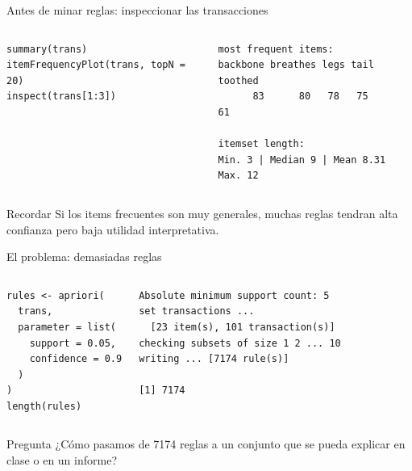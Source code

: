 \documentclass[10pt,aspectratio=169]{beamer}
\begin{document}
\begin{frame}[fragile]{Antes de minar reglas: inspeccionar las transacciones}
\begin{columns}[T]
\begin{lstlisting}[style=rcode]
summary(trans)
itemFrequencyPlot(trans, topN = 20)
inspect(trans[1:3])
\end{lstlisting}

\begin{lstlisting}[style=out]
most frequent items:
backbone breathes legs tail toothed
      83      80   78   75      61

itemset length:
Min. 3 | Median 9 | Mean 8.31
Max. 12
\end{lstlisting}
\end{columns}

\begin{alertblock}{Recordar}
Si los items frecuentes son muy generales, muchas reglas tendran alta confianza pero baja utilidad interpretativa.
\end{alertblock}
\end{frame}

\begin{frame}[fragile]{El problema: demasiadas reglas}
\begin{columns}[T]
\begin{lstlisting}[style=rcode]
rules <- apriori(
  trans,
  parameter = list(
    support = 0.05,
    confidence = 0.9
  )
)
length(rules)
\end{lstlisting}

\begin{lstlisting}[style=out]
Absolute minimum support count: 5
set transactions ...
  [23 item(s), 101 transaction(s)]
checking subsets of size 1 2 ... 10
writing ... [7174 rule(s)]

[1] 7174
\end{lstlisting}
\end{columns}

\vspace{0.2cm}
\begin{block}{Pregunta }
\centering
¿Cómo pasamos de 7174 reglas a un conjunto que se pueda explicar en clase o en un informe?
\end{block}
\end{frame}
\end{document}
